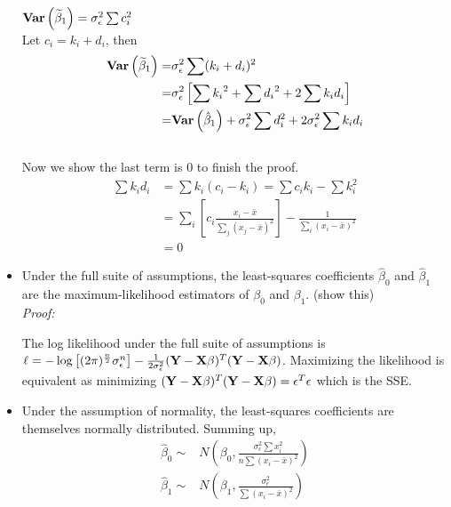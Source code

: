 \begin{itemize}
\begin{pf}
  $\mathbf{Var}\left(\widetilde{\beta}_1\right) = \sigma_\epsilon^2 \sum c_i^2$\\
  Let $c_i = k_i + d_i$, then 
  $$
  \begin{aligned}
  \mathbf{Var}\left(\widetilde{\beta}_1\right) =& \sigma_\epsilon^2 \sum(k_i + d_i)^2\\
   =&  \sigma_\epsilon^2 \left[ \sum{k_i}^2 + \sum{d_i}^2 + 2\sum{k_i d_i} \right] \\
   =& \mathbf{Var}\left(\hat{\beta}_1\right) + \sigma_\epsilon^2 \sum d_i^2 + 2 \sigma_\epsilon^2 \sum k_i d_i \\
  \end{aligned}$$\\
  Now we show the last term is $0$ to finish the proof.
  $$
  \begin{aligned}
  \sum k_i d_i &= \sum k_i (c_i - k_i) = \sum c_i k_i - \sum k_i^2\\
  &= \sum_i \left[ c_i \frac{x_i - \bar{x}}{\sum_j (x_j- \bar{x})^2}\right] - \frac{1}{\sum_i (x_i - \bar{x})^2}\\
  &= 0
  \end{aligned}
  $$
\end{pf}
  
  \item Under the full suite of assumptions, the least-squares coefficients $\hat{\beta}_0$ and $\hat{\beta}_1$ are the maximum-likelihood estimators of $\beta_0$ and $\beta_1$. 
  (show this)\\
  {\it Proof:}\\
  \begin{pf}
  The log likelihood under the full suite of assumptions is $\ell = -\log\left[(2\pi)^{\frac{n}{2}} \sigma^n_\epsilon \right] - \frac{1}{2 \sigma^2_\epsilon}(\mathbf{Y} - \mathbf{X\beta})^T(\mathbf{Y} - \mathbf{X\beta})$.
  Maximizing the likelihood is equivalent as minimizing $(\mathbf{Y} - \mathbf{X\beta})^T(\mathbf{Y} - \mathbf{X\beta}) = \mathbf{\epsilon}^T \mathbf{\epsilon}$ which is the SSE.  
  \end{pf}
  
  
  \item Under the assumption of normality, the least-squares coefficients are themselves normally distributed.  Summing up,
  $$
  \begin{aligned}
    \hat{\beta}_0 \sim& N(\beta_0, \frac{\sigma^2_\epsilon \sum{x_i^2}}{n\sum(x_i - \bar{x})^2}) \\
    \hat{\beta}_1 \sim & N(\beta_1, \frac{\sigma^2_\epsilon}{\sum(x_i - \bar{x})^2})\\
  \end{aligned}
  $$
\end{itemize}


